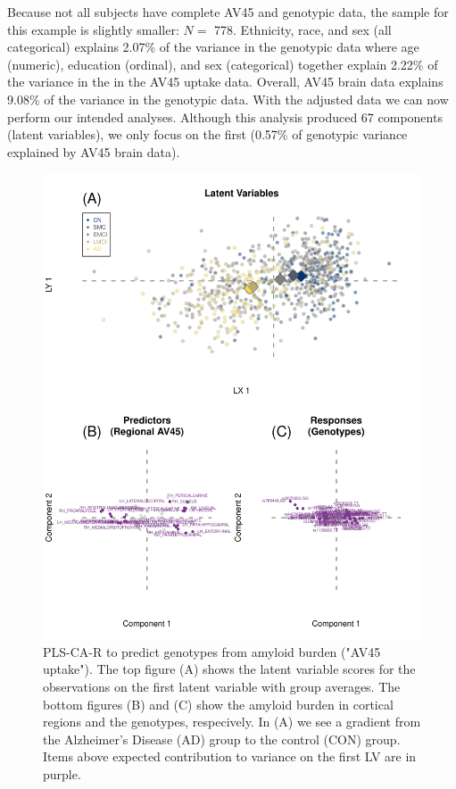 \documentclass[12pt]{article}
\begin{document}
Because not all subjects have complete AV45 and genotypic data, the
sample for this example is slightly smaller: \(N=\) 778. Ethnicity,
race, and sex (all categorical) explains 2.07\% of the variance in the
genotypic data where age (numeric), education (ordinal), and sex
(categorical) together explain 2.22\% of the variance in the in the AV45
uptake data. Overall, AV45 brain data explains 9.08\% of the variance in
the genotypic data. With the adjusted data we can now perform our
intended analyses. Although this analysis produced 67 components (latent
variables), we only focus on the first (0.57\% of genotypic variance
explained by AV45 brain data).

\begin{figure}[!hbtp]

{\centering \includegraphics[width=.8\textwidth,height=.8\textheight]{PLSCAR_to_a_GPLS_files/figure-latex/unnamed-chunk-13-1} 

}

\caption{\label{fig:brain_genotypes_ex2} PLS-CA-R to predict genotypes from amyloid burden ("AV45 uptake"). The top figure (A) shows the latent variable scores for the observations on the first latent variable with group averages. The bottom figures (B) and (C) show the amyloid burden in cortical regions and the genotypes, respecively. In (A) we see a gradient from the Alzheimer's Disease (AD) group to the control (CON) group. Items above expected contribution to variance on the first LV are in purple.}\label{fig:unnamed-chunk-13}
\end{figure}
\end{document}
